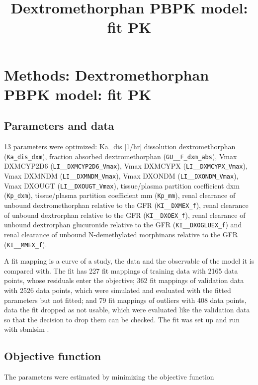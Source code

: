 \documentclass{article}
\title{Dextromethorphan PBPK model: fit PK}
\date{}
\begin{document}
\maketitle

\section{Methods: Dextromethorphan PBPK model: fit PK}

\subsection{Parameters and data}

13 parameters were optimized: Ka\_dis [1/hr] dissolution dextromethorphan (\texttt{Ka\_dis\_dxm}), fraction absorbed dextromethorphan (\texttt{GU\_\_F\_dxm\_abs}), Vmax DXMCYP2D6 (\texttt{LI\_\_DXMCYP2D6\_Vmax}), Vmax DXMCYPX (\texttt{LI\_\_DXMCYPX\_Vmax}), Vmax DXMNDM (\texttt{LI\_\_DXMNDM\_Vmax}), Vmax DXONDM (\texttt{LI\_\_DXONDM\_Vmax}), Vmax DXOUGT (\texttt{LI\_\_DXOUGT\_Vmax}), tissue/plasma partition coefficient dxm (\texttt{Kp\_dxm}), tissue/plasma partition coefficient mm (\texttt{Kp\_mm}), renal clearance of unbound dextromethorphan relative to the GFR (\texttt{KI\_\_DXMEX\_f}), renal clearance of unbound dextrorphan relative to the GFR (\texttt{KI\_\_DXOEX\_f}), renal clearance of unbound dextrorphan glucuronide relative to the GFR (\texttt{KI\_\_DXOGLUEX\_f}) and renal clearance of unbound N-demethylated morphinans relative to the GFR (\texttt{KI\_\_MMEX\_f}).

A fit mapping is a curve of a study, the data and the observable of the model it is compared with. The fit has 227 fit mappings of training data with 2165 data points, whose residuals enter the objective; 362 fit mappings of validation data with 2526 data points, which were simulated and evaluated with the fitted parameters but not fitted; and 79 fit mappings of outliers with 408 data points, data the fit dropped as not usable, which were evaluated like the validation data so that the decision to drop them can be checked. The fit was set up and run with sbmlsim \cite{Koenig2026_sbmlsim}.

\subsection{Objective function}

The parameters were estimated by minimizing the objective function
\end{document}
